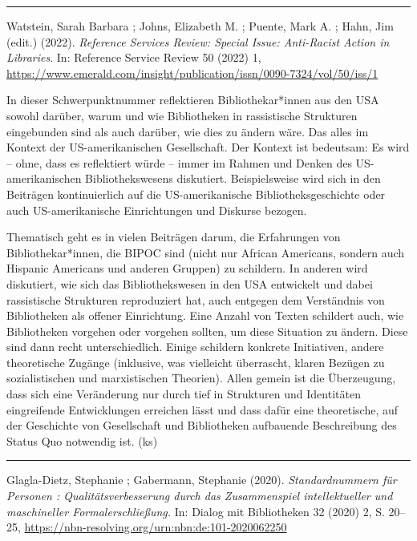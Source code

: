 \documentclass[a4paper,
fontsize=11pt,
oneside,
numbers=noperiodatend,
parskip=half-,
bibliography=totoc,
final
]{scrartcl}
\begin{document}
\begin{center}\rule{0.5\linewidth}{0.5pt}\end{center}

Watstein, Sarah Barbara ; Johns, Elizabeth M. ; Puente, Mark A. ; Hahn,
Jim (edit.) (2022). \emph{Reference Services Review: Special Issue:
Anti-Racist Action in Libraries}. In: Reference Service Review 50 (2022)
1,
\url{https://www.emerald.com/insight/publication/issn/0090-7324/vol/50/iss/1}

In dieser Schwerpunktnummer reflektieren Bibliothekar*innen aus den USA
sowohl darüber, warum und wie Bibliotheken in rassistische Strukturen
eingebunden sind als auch darüber, wie dies zu ändern wäre. Das alles im
Kontext der US-amerikanischen Gesellschaft. Der Kontext ist bedeutsam:
Es wird -- ohne, dass es reflektiert würde -- immer im Rahmen und Denken
des US-amerikanischen Bibliothekswesens diskutiert. Beispielsweise wird
sich in den Beiträgen kontinuierlich auf die US-amerikanische
Bibliotheksgeschichte oder auch US-amerikanische Einrichtungen und
Diskurse bezogen.

Thematisch geht es in vielen Beiträgen darum, die Erfahrungen von
Bibliothekar*innen, die BIPOC sind (nicht nur African Americans, sondern
auch Hispanic Americans und anderen Gruppen) zu schildern. In anderen
wird diskutiert, wie sich das Bibliothekswesen in den USA entwickelt und
dabei rassistische Strukturen reproduziert hat, auch entgegen dem
Verständnis von Bibliotheken als offener Einrichtung. Eine Anzahl von
Texten schildert auch, wie Bibliotheken vorgehen oder vorgehen sollten,
um diese Situation zu ändern. Diese sind dann recht unterschiedlich.
Einige schildern konkrete Initiativen, andere theoretische Zugänge
(inklusive, was vielleicht überrascht, klaren Bezügen zu sozialistischen
und marxistischen Theorien). Allen gemein ist die Überzeugung, dass sich
eine Veränderung nur durch tief in Strukturen und Identitäten
eingreifende Entwicklungen erreichen lässt und dass dafür eine
theoretische, auf der Geschichte von Gesellschaft und Bibliotheken
aufbauende Beschreibung des Status Quo notwendig ist. (ks)

\begin{center}\rule{0.5\linewidth}{0.5pt}\end{center}

Glagla-Dietz, Stephanie ; Gabermann, Stephanie (2020).
\emph{Standardnummern für Personen : Qualitätsverbesserung durch das
Zusammenspiel intellektueller und maschineller Formalerschließung.} In:
Dialog mit Bibliotheken 32 (2020) 2, S. 20--25,
\url{https://nbn-resolving.org/urn:nbn:de:101-2020062250}
\end{document}
